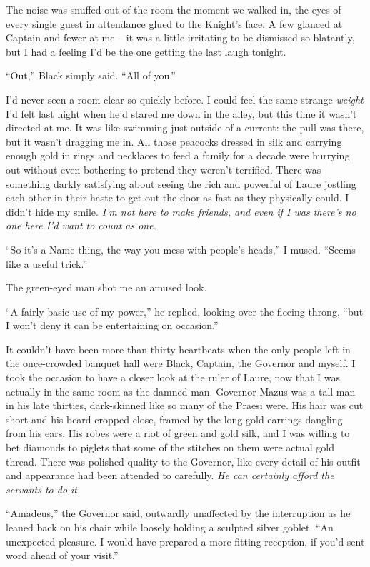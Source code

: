 \documentclass[12pt, openany]{book}
\begin{document}
The noise was snuffed out of the room the moment we walked in, the eyes of every single guest in attendance glued to the Knight’s face. A few glanced at Captain and fewer at me – it was a little irritating to be dismissed so blatantly, but I had a feeling I’d be the one getting the last laugh tonight.

“Out,” Black simply said. “All of you.”

I’d never seen a room clear so quickly before. I could feel the same strange \textit{weight} I’d felt last night when he’d stared me down in the alley, but this time it wasn’t directed at me. It was like swimming just outside of a current: the pull was there, but it wasn’t dragging me in. All those peacocks dressed in silk and carrying enough gold in rings and necklaces to feed a family for a decade were hurrying out without even bothering to pretend they weren’t terrified. There was something darkly satisfying about seeing the rich and powerful of Laure jostling each other in their haste to get out the door as fast as they physically could. I didn’t hide my smile. \textit{I’m not here to make friends, and even if I was there’s no one here I’d want to count as one.}

“So it’s a Name thing, the way you mess with people’s heads,” I mused. “Seems like a useful trick.”

The green-eyed man shot me an amused look.

“A fairly basic use of my power,” he replied, looking over the fleeing throng, “but I won’t deny it can be entertaining on occasion.”

It couldn’t have been more than thirty heartbeats when the only people left in the once-crowded banquet hall were Black, Captain, the Governor and myself. I took the occasion to have a closer look at the ruler of Laure, now that I was actually in the same room as the damned man. Governor Mazus was a tall man in his late thirties, dark-skinned like so many of the Praesi were. His hair was cut short and his beard cropped close, framed by the long gold earrings dangling from his ears. His robes were a riot of green and gold silk, and I was willing to bet diamonds to piglets that some of the stitches on them were actual gold thread. There was polished quality to the Governor, like every detail of his outfit and appearance had been attended to carefully. \textit{He can certainly afford the servants to do it.}

“Amadeus,” the Governor said, outwardly unaffected by the interruption as he leaned back on his chair while loosely holding a sculpted silver goblet. “An unexpected pleasure. I would have prepared a more fitting reception, if you’d sent word ahead of your visit.”
\end{document}
